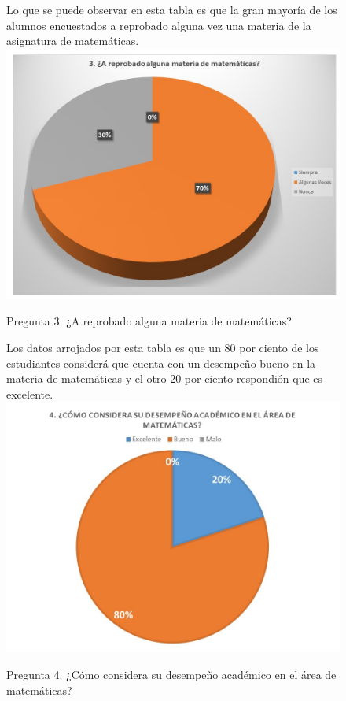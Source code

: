 \documentclass[12pt] {report}
\begin{document}
\begin{figure}[H]
\centering
Lo que se puede observar en esta tabla es que la gran mayoría de los alumnos encuestados a reprobado alguna vez una materia de la asignatura de matemáticas.
\includegraphics[scale=.4]{pregunta3.JPG}
\caption{Pregunta 3. ¿A reprobado alguna materia de matemáticas?}
\end{figure}
\begin{figure}[H]
\centering
Los datos arrojados por esta tabla es que un 80 por ciento de los estudiantes considerá que cuenta con un desempeño bueno en la materia de matemáticas y el otro 20 por ciento respondión que es excelente.
\includegraphics[scale=.4]{pregunta4.JPG}
\caption{Pregunta 4. ¿Cómo considera su desempeño académico en el área de matemáticas?}
\end{figure}
\end{document}
